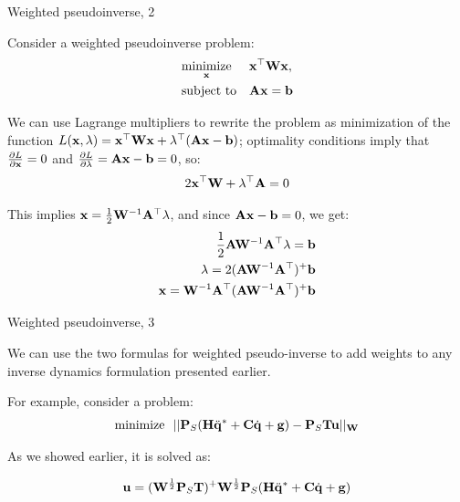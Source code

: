 \documentclass{beamer}
\begin{document}
\begin{frame}{Weighted pseudoinverse, 2}
	\begin{flushleft}
		
		Consider a weighted pseudoinverse problem:
\begin{equation}
	\begin{aligned}
		& \underset{\mathbf{x}}{\text{minimize}}
		& & \mathbf{x}^\top \mathbf{W} \mathbf{x}, \\
		& \text{subject to}
		& & \mathbf{A}\mathbf{x}=\mathbf{b}
	\end{aligned}
\end{equation}
		
		We can use Lagrange multipliers to rewrite the problem as minimization of the function $L(\mathbf{x}, \lambda) = \mathbf{x}^\top \mathbf{W} \mathbf{x} + \lambda^\top ( \mathbf{A}\mathbf{x}-\mathbf{b})$; optimality conditions imply that $\frac{\partial L}{\partial  \mathbf{x}} = 0$ and $\frac{\partial  L}{\partial  \lambda} = \mathbf{A}\mathbf{x}-\mathbf{b} = 0$, so:
		\begin{align}
			2\mathbf{x}^\top \mathbf{W} + \lambda^\top \mathbf{A} = 0
		\end{align}		
		
		This implies $\mathbf{x} = \frac{1}{2} \mathbf{W}^{-1} \mathbf{A}^\top \lambda$, and since $\mathbf{A}\mathbf{x}-\mathbf{b} = 0$, we get:
		\begin{align}
			\frac{1}{2}\mathbf{A}\mathbf{W}^{-1} \mathbf{A}^\top \lambda= \mathbf{b} \\
			\lambda = 2 (\mathbf{A}\mathbf{W}^{-1} \mathbf{A}^\top)^+ \mathbf{b} \\
			\mathbf{x} = \mathbf{W}^{-1} \mathbf{A}^\top (\mathbf{A}\mathbf{W}^{-1} \mathbf{A}^\top)^+ \mathbf{b}
		\end{align}		
		
		
	\end{flushleft}
\end{frame}



\begin{frame}{Weighted pseudoinverse, 3}
	\begin{flushleft}
		
		We can use the two formulas for weighted pseudo-inverse to add weights to any inverse dynamics formulation presented earlier.
		
		\bigskip
		
		For example, consider a problem:
		\begin{align}
			\text{minimize} \ \ ||\mathbf{P}_S(\mathbf{H}\ddot{\mathbf{q}}^* + \mathbf{C}\dot{\mathbf{q}}+ \mathbf{g}) - \mathbf{P}_S\mathbf{T}\mathbf{u}||_{\mathbf{W}}
		\end{align}		
		
		As we showed earlier, it is solved as:
		
		\begin{align}
			\mathbf{u}=(\mathbf{W}^\frac{1}{2}\mathbf{P}_S\mathbf{T})^+\mathbf{W}^\frac{1}{2}
			\mathbf{P}_S(\mathbf{H}\ddot{\mathbf{q}}^* + \mathbf{C}\dot{\mathbf{q}}+ \mathbf{g})
		\end{align}
		
		
	\end{flushleft}
\end{frame}
\end{document}
